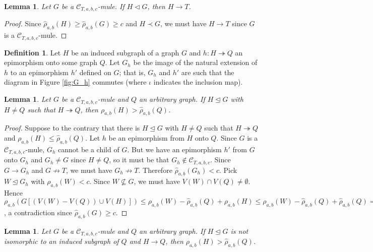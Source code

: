 \documentclass[12pt]{amsart}
\theoremstyle{plain}
\newtheorem{lem}[thm]{Lemma}
\theoremstyle{definition}
\newtheorem{defn}{Definition}
\theoremstyle{remark}
\newcommand{\fancy}[1]{\mathcal{#1}}
\newcommand{\C}{\fancy{C}}
\newcommand{\surj}{\twoheadrightarrow}
\newcommand{\funcsurj}[3]{#1\colon #2 \surj #3}
\newcommand{\parens}[1]{\left( #1 \right)}
\newcommand{\brackets}[1]{\left[ #1 \right]}
\begin{document}
\begin{lem}\label{Criticality}
Let $G$ be a $\C_{T,a,b,c}$-mule.  If $H \lhd G$, then $H \rightarrow T$.
\end{lem}
\begin{proof}
Since $\hat{\rho}_{a,b}(H) \ge \hat{\rho}_{a,b}(G) \ge c$ and $H \prec G$, we must have $H \rightarrow T$ since $G$ is a $\C_{T,a,b,c}$-mule.
\end{proof}

\begin{defn}\label{InducedHomomorphism}
Let $H$ be an induced subgraph of a graph $G$ and $\funcsurj{h}{H}{Q}$ an epimorphism onto some graph $Q$. Let $G_h$ be the image of the natural extension of $h$ to an epimorphism $h'$ defined on $G$; that is, $G_h$ and $h'$ are such that the diagram in Figure \ref{fig:G_h} commutes (where $\iota$ indicates the inclusion map).
\end{defn}

\begin{lem}\label{ArbitraryQ}
Let $G$ be a $\C_{T,a,b,c}$-mule and $Q$ an arbitrary graph.  If $H \unlhd G$ with $H \ne Q$ such that $H \surj Q$, then $\rho_{a,b}(H) > \hat{\rho}_{a,b}(Q)$.
\end{lem}
\begin{proof}
Suppose to the contrary that there is $H \unlhd G$ with $H \ne Q$ such that $H \surj Q$ and $\rho_{a,b}(H) \le \hat{\rho}_{a,b}(Q)$.  
Let $h$ be an epimorphism from $H$ onto $Q$. Since $G$ is a $\C_{T,a,b,c}$-mule, $G_h$ cannot be a child of $G$.  But we have an epimorphism $h'$ from $G$ onto $G_h$ and $G_h \ne G$ since $H \ne Q$, so it must be that $G_h \not \in \C_{T,a,b,c}$.  Since $G \rightarrow G_h$ and $G \not \rightarrow T$, we must have $G_h \not \rightarrow T$.  Therefore $\hat{\rho}_{a,b}(G_h) < c$.  Pick $W \unlhd G_h$ with $\rho_{a,b}(W) < c$.  Since $W \not \subseteq G$, we must have $V(W) \cap V(Q) \ne \emptyset$.  Hence $\rho_{a,b}\parens{G\brackets{(V(W) - V(Q)) \cup V(H)}} \le \rho_{a,b}(W) - \hat{\rho}_{a,b}(Q) + \rho_{a,b}(H) \le \rho_{a,b}(W) - \hat{\rho}_{a,b}(Q) + \hat{\rho}_{a,b}(Q) = \rho_{a,b}(W) < c$, a contradiction since $\hat{\rho}_{a,b}(G) \ge c$.
\end{proof}

\begin{lem}\label{ArbitraryQInto}
Let $G$ be a $\C_{T,a,b,c}$-mule and $Q$ an arbitrary graph.  If $H \unlhd G$ is not isomorphic to an induced subgraph of $Q$ and $H \rightarrow Q$, then $\rho_{a,b}(H) > \hat{\rho}_{a,b}(Q)$.
\end{lem}
\end{document}
